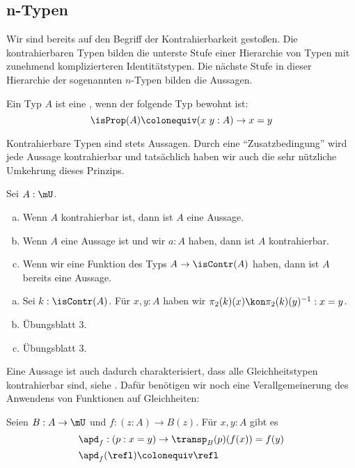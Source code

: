 \subsection{n-Typen}

Wir sind bereits auf den Begriff der Kontrahierbarkeit gestoßen.
Die kontrahierbaren Typen bilden die unterste Stufe einer Hierarchie
von Typen mit zunehmend komplizierteren Identitätstypen.
Die nächste Stufe in dieser Hierarchie der sogenannten $n$-Typen bilden die Aussagen.

\begin{definition}
  Ein Typ $A$ ist eine , wenn der folgende Typ bewohnt ist:
  \[
    \isProp(A)\colonequiv (x\ y : A)\to x=y
  \]
\end{definition}

Kontrahierbare Typen sind stets Aussagen.
Durch eine ``Zusatzbedingung'' wird jede Aussage kontrahierbar und tatsächlich haben wir auch die sehr nützliche Umkehrung dieses Prinzips.

\begin{bemerkung}
  Sei $A:\mU$.
  \begin{enumerate}[(a)]
  \item Wenn $A$ kontrahierbar ist, dann ist $A$ eine Aussage.
  \item Wenn $A$ eine Aussage ist und wir $a:A$ haben, dann ist $A$ kontrahierbar.
  \item Wenn wir eine Funktion des Typs $A\to \isContr(A)$ haben, dann ist $A$ bereits eine Aussage. 
  \end{enumerate}
\end{bemerkung}

\begin{beweis}
  \begin{enumerate}[(a)]
  \item Sei $k:\isContr(A)$. Für $x,y:A$ haben wir $\pi_2(k)(x)\kon\pi_2(k)(y)^{-1}:x=y$.
  \item Übungsblatt 3.
  \item Übungsblatt 3.
  \end{enumerate}
\end{beweis}

Eine Aussage ist auch dadurch charakterisiert, dass alle Gleichheitstypen kontrahierbar sind, siehe .
Dafür benötigen wir noch eine Verallgemeinerung des Anwendens von Funktionen auf Gleichheiten:

\begin{definition}
  Seien $B:A\to \mU$ und $f:(z:A)\to B(z)$.
  Für $x,y:A$ gibt es
  \begin{align*}
    &\apd_f : (p:x=y) \to \transp_B(p)(f(x))=f(y) \\
    &\apd_f(\refl)\colonequiv \refl
  \end{align*}
\end{definition}

